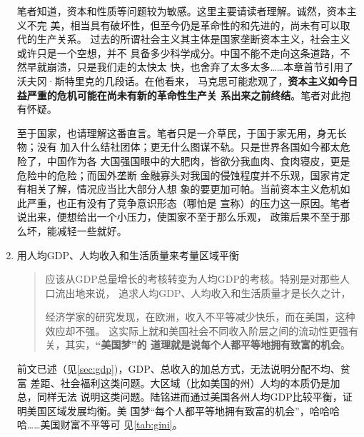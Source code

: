 \begin{enumerate}

  笔者知道，资本和性质等问题较为敏感。这里主要请读者理解。诚然，资本主义不完
  美，相当具有破坏性，但至今仍是革命性的和先进的，尚未有可以取代的生产关系。
  过去的所谓社会主义其主体是国家垄断资本主义，社会主义或许只是一个空想，并不
  具备多少科学成分。中国不能不走向这条道路，不然早就崩溃，只是我们走的太快太
  快，也舍弃了太多太多……本章首节引用了沃夫冈·斯特里克的几段话。在他看来，
  马克思可能悲观了，\textbf{资本主义如今日益严重的危机可能在尚未有新的革命性生产关
    系出来之前终结}。笔者对此抱有怀疑。

  至于国家，也请理解这番直言。笔者只是一介草民，于国于家无用，身无长物；没有
  加入什么结社团体；更无什么图谋不轨。只是世界各国如今都太危险了，中国作为各
  大国强国眼中的大肥肉，皆欲分我血肉、食肉寝皮，更是危险中的危险；而国外垄断
  金融寡头对我国的侵蚀程度并不乐观，国家肯定有相关了解，情况应当比大部分人想
  象的要更加可帕。当前资本主义危机如此严重，也正有没有了竞争意识形态（哪怕是
  宣称）的压力这一原因。笔者说出来，便想给出一个小压力，使国家不至于那么乐观，
  政策后果不至于那么坏，能减轻一些就好。


\item 用人均GDP、人均收入和生活质量来考量区域平衡

  \begin{quotation}
    应该从GDP总量增长的考核转变为人均GDP的考核。特别是对那些人口流出地来说，
    追求人均GDP、人均收入和生活质量才是长久之计，

    经济学家的研究发现，在欧洲，收入不平等减少快乐，而在美国，这种效应却不强。
    这实际上就和美国社会不同收入阶层之间的流动性更强有关，其实，\textbf{“美国梦”的
      道理就是说每个人都平等地拥有致富的机会}。
  \end{quotation}

  前文已述（见\cref{sec:gdp})，GDP、总收入的加总方式，无法说明分配不均、贫富
  差距、社会福利这类问题。大区域（比如美国的州）人均的本质仍是加总，同样无法
  说明这类问题。陆铭进而通过美国各州人均GDP比较平衡，证明美国区域发展均衡。美
  国梦“每个人都平等地拥有致富的机会”，哈哈哈哈……美国财富不平等可
  见\cref{tab:gini}。


\end{enumerate}
